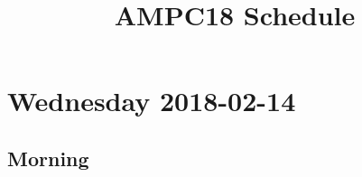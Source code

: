 \documentclass[]{article}
\title{AMPC18 Schedule}
\author{}
\date{}
\begin{document}
\maketitle

\renewcommand{\arraystretch}{1.5}







\section{Wednesday 2018-02-14}\label{wednesday-2018-02-14}

\subsection{Morning}\label{morning}
\end{document}
